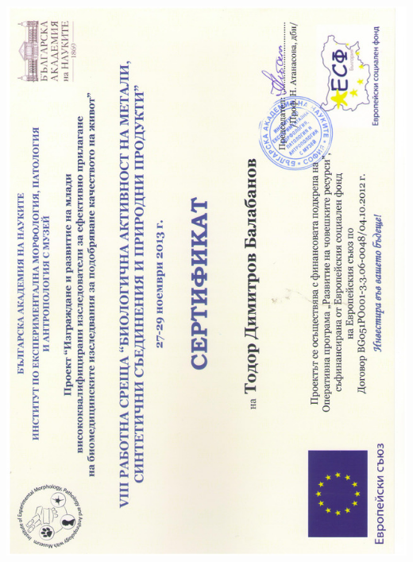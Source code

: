 \documentclass[bulgarian,a4paper]{europasscv}
\begin{document}
\includegraphics[width=\textwidth,height=\textheight,keepaspectratio]{IEMPAM2013_5}
\end{document}
